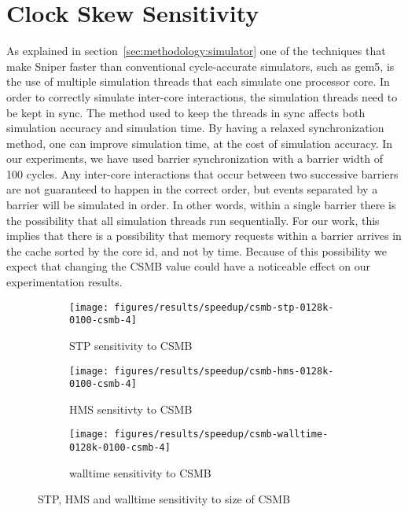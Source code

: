 
\section{Clock Skew Sensitivity}
\label{sec:results:csmb_sensitivity}

As explained in section~\ref{sec:methodology:simulator} one of the techniques that make Sniper faster than conventional cycle-accurate simulators, such as gem5, is the use of multiple simulation threads that each simulate one processor core.
In order to correctly simulate inter-core interactions, the simulation threads need to be kept in sync.
The method used to keep the threads in sync affects both simulation accuracy and simulation time.
By having a relaxed synchronization method, one can improve simulation time, at the cost of simulation accuracy.
In our experiments, we have used barrier synchronization with a barrier width of 100 cycles.
Any inter-core interactions that occur between two successive barriers are not guaranteed to happen in the correct order, but events separated by a barrier will be simulated in order.
In other words, within a single barrier there is the possibility that all simulation threads run sequentially.
For our work, this implies that there is a possibility that memory requests within a barrier arrives in the cache sorted by the core id, and not by time.
Because of this possibility we expect that changing the CSMB value could have a noticeable effect on our experimentation results.

\begin{figure}
    \centering
    \begin{subfigure}[b]{0.5\textwidth}
        \texttt{[image: figures/results/speedup/csmb-stp-0128k-0100-csmb-4]}
        \caption{STP sensitivity to CSMB}
        \label{fig:results:csmb:stp}
    \end{subfigure}%
    \begin{subfigure}[b]{0.5\textwidth}
        \texttt{[image: figures/results/speedup/csmb-hms-0128k-0100-csmb-4]}
        \caption{HMS sensitivty to CSMB}
        \label{fig:results:csmb:hms}
    \end{subfigure}
    \begin{subfigure}[b]{0.6\textwidth}
        \texttt{[image: figures/results/speedup/csmb-walltime-0128k-0100-csmb-4]}
        \caption{walltime sensitivity to CSMB}
        \label{fig:results:csmb:mpki}
    \end{subfigure}
    \caption{STP, HMS and walltime sensitivity to size of CSMB}
    \label{fig:results:csmb}
\end{figure}



